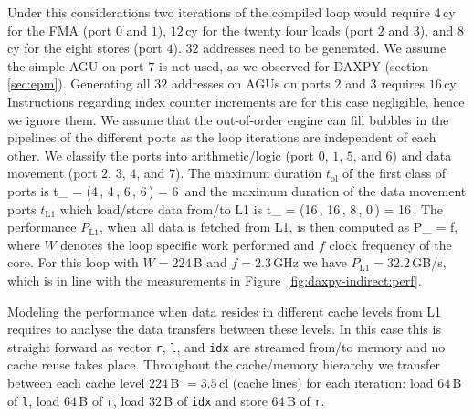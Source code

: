 Under this considerations two iterations of the compiled loop would require $4$\,cy
for the FMA (port $0$ and $1$), $12$\,cy for the twenty four loads (port $2$ and $3$),
and $8$\,cy for the eight stores (port $4$).
$32$ addresses need to be generated. We assume the simple AGU on port $7$ is not used, as we observed for DAXPY (section \ref{sec:epm}). Generating all $32$ addresses on AGUs on ports $2$ and $3$ requires $16$\,cy.
Instructions regarding index counter increments are for this case negligible, hence we ignore them.
We assume that the out-of-order engine can fill bubbles in the pipelines of the
different ports as the loop iterations are independent of each other.
We classify the ports into arithmetic/logic (port $0$, $1$, $5$, and $6$) and
data movement (port $2$, $3$, $4$, and $7$). 
The maximum duration $t_\text{ol}$ of the first class of ports is 
%
\be
  t_ = \max(4\,\cyw, 4\,\cyw, 6\,\cyw, 6\,\cyw)
= 6\,\cyw
\ee
%
and the maximum duration of the data movement ports $t_\text{L1}$ which
load/store data from/to L1 is
\be
  t_ = \max(16\,\cyw, 16\,\cyw, 8\,\cyw, 0\,\cyw) =
16\,\cyw.
\ee
%
%
The performance $P_\text{L1}$, when all data is fetched from L1, is then computed as 
%
\be
  P_ =  f,
\ee
%
where $W$ denotes the loop specific work performed and $f$ clock frequency of the core.
For this loop with $W=224$\,B and $f=2.3$\,GHz we have $P_\text{L1} =
32.2$\,GB/s,
which is in line with the measurements in
Figure~\ref{fig:daxpy-indirect:perf}.

Modeling the performance when data resides in different cache levels from L1
requires to analyse the data transfers between these levels.
In this case this is straight forward as vector \verb'r', \verb'l', and
\verb'idx' are streamed from/to memory and no cache reuse takes place.
Throughout the cache/memory hierarchy we transfer between each cache level
$224$\,B $= 3.5$\,cl (cache lines) for each iteration: load $64$\,B of
\verb'l', load $64$\,B of \verb'r', load $32$\,B of \verb'idx' and store $64$\,B
of \verb'r'.


